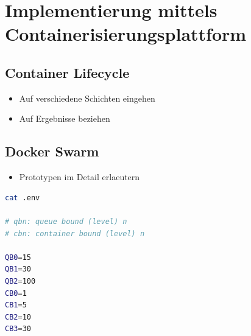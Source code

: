 \section{Implementierung mittels Containerisierungsplattform}
\subsection{Container Lifecycle}
\begin{itemize}
  \item Auf verschiedene Schichten eingehen
  \item Auf Ergebnisse beziehen
\end{itemize}
\subsection{Docker Swarm}

\begin{itemize}
  \item Prototypen im Detail erlaeutern
\end{itemize}


\renewcommand\theadalign{bc}
\renewcommand\theadfont{\bfseries}
\renewcommand\theadgape{\Gape[4pt]}
\renewcommand\cellgape{\Gape[4pt]}


\begin{lstlisting}[language=bash]
cat .env

# qbn: queue bound (level) n
# cbn: container bound (level) n

QB0=15
QB1=30
QB2=100
CB0=1
CB1=5
CB2=10
CB3=30
\end{lstlisting}


